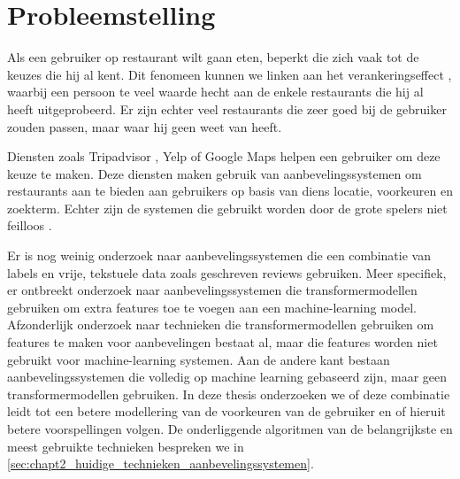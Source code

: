 
\section{Probleemstelling}
Als een gebruiker op restaurant wilt gaan eten, beperkt die zich vaak tot de keuzes die hij al kent. Dit fenomeen kunnen we linken aan het verankeringseffect \cite{anchoring_effect}, waarbij een persoon te veel waarde hecht aan de enkele restaurants die hij al heeft uitgeprobeerd. Er zijn echter veel restaurants die zeer goed bij de gebruiker zouden passen, maar waar hij geen weet van heeft.

Diensten zoals Tripadvisor \cite{tripadvisor_algorithm}, Yelp of Google Maps helpen een gebruiker om deze keuze te maken. Deze diensten maken gebruik van aanbevelingssystemen om restaurants aan te bieden aan gebruikers op basis van diens locatie, voorkeuren en zoekterm. Echter zijn de systemen die gebruikt worden door de grote spelers niet feilloos \cite{recsys_bad, recsys_youtube_bad}. 

Er is nog weinig onderzoek naar aanbevelingssystemen die een combinatie van labels en vrije, tekstuele data zoals geschreven reviews gebruiken. Meer specifiek, er ontbreekt onderzoek naar aanbevelingssystemen die transformermodellen gebruiken om extra features toe te voegen aan een machine-learning model. Afzonderlijk onderzoek naar technieken die transformermodellen gebruiken om features te maken voor aanbevelingen bestaat al, maar die features worden niet gebruikt voor machine-learning systemen. \cite{masterthesis_nlp_italie} Aan de andere kant bestaan aanbevelingssystemen die volledig op machine learning gebaseerd zijn, maar geen transformermodellen gebruiken. \cite{deepconn} In deze thesis onderzoeken we of deze combinatie leidt tot een betere modellering van de voorkeuren van de gebruiker en of hieruit betere voorspellingen volgen. De onderliggende algoritmen van de belangrijkste en meest gebruikte technieken bespreken we in \autoref{sec:chapt2_huidige_technieken_aanbevelingssystemen}. 


